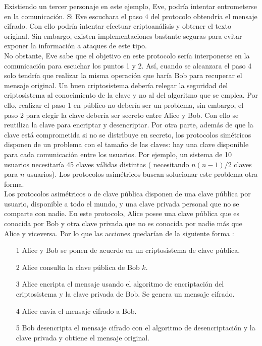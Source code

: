 \documentclass[../PFC.tex]{subfiles}
\begin{document}
Existiendo un tercer personaje en este ejemplo, Eve, podría intentar entrometerse en la comunicación. Si Eve escuchara el paso 4 del protocolo obtendría el mensaje cifrado. Con ello podría intentar efectuar criptoanálisis y obtener el texto original. Sin embargo, existen implementaciones bastante seguras para evitar exponer la información a ataques de este tipo.
\*
\vspace{0.5515cm}
\\
No obstante, Eve sabe que el objetivo en este protocolo sería interponerse en la comunicación para escuchar los puntos 1 y 2. Así, cuando se alcanzara el paso 4 solo tendría que realizar la misma operación que haría Bob para recuperar el mensaje original. Un buen criptosistema debería relegar la seguridad del criptosistema al conocimiento de la clave y no al del algoritmo que se emplea. Por ello, realizar el paso 1 en público no debería ser un problema, sin embargo, el paso 2 para elegir la clave debería ser secreto entre Alice y Bob. Con ello se reutiliza la clave para encriptar y desencriptar. Por otra parte, además de que la clave está comprometida si no se distribuye en secreto, los protocolos simétricos disponen de un problema con el tamaño de las claves: hay una clave disponible para cada comunicación entre los usuarios. Por ejemplo, un sistema de 10 usuarios necesitaría 45 claves válidas distintas ( necesitando $n(n-1)/2$ claves para $n$ usuarios).
Los protocolos asimétricos buscan solucionar este problema otra forma.
\*
\vspace{0.5515cm}
\\
Los protocolos asimétricos o de clave pública disponen de una clave pública por usuario, disponible a todo el mundo, y una clave privada personal que no se comparte con nadie. En este protocolo, Alice posee una clave pública que es conocida por Bob y otra clave privada que no es conocida por nadie más que Alice y viceversa. Por lo que las acciones quedarían de la siguiente forma :

\begin{itemize}
\item[1]{Alice y Bob se ponen de acuerdo en un criptosistema de clave pública.}
\item[2]{Alice consulta la clave pública de Bob $k$.}
\item[3]{Alice encripta el mensaje usando el algoritmo de encriptación del criptosistema y la clave privada de Bob. Se genera un mensaje cifrado.}
\item[4]{Alice envía el mensaje cifrado a Bob.}
\item[5]{Bob desencripta el mensaje cifrado con el algoritmo de desencriptación y la clave privada y obtiene el mensaje original.}
\end{itemize}
\end{document}
